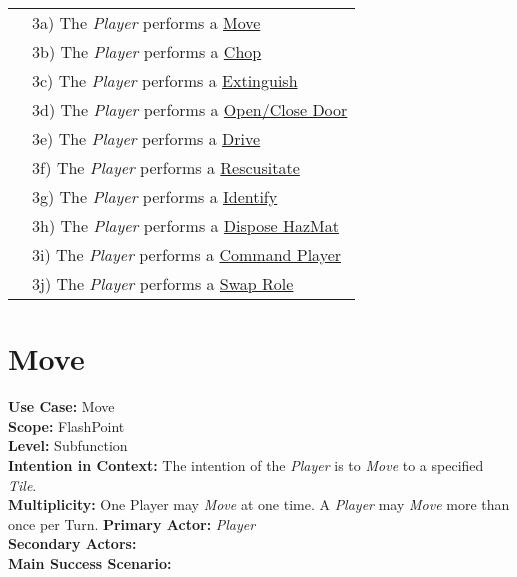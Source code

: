 \documentclass{article}
\begin{document}
	\begin{tabular}{l l}
		&3a) The \textit{Player} performs a \underline{Move}\\
		&3b) The \textit{Player} performs a \underline{Chop}\\
		&3c) The \textit{Player} performs a \underline{Extinguish}\\
		&3d) The \textit{Player} performs a \underline{Open/Close Door}\\
		&3e) The \textit{Player} performs a \underline{Drive}\\
		&3f) The \textit{Player} performs a \underline{Rescusitate}\\
		&3g) The \textit{Player} performs a \underline{Identify}\\
		&3h) The \textit{Player} performs a \underline{Dispose HazMat}\\
		&3i) The \textit{Player} performs a \underline{Command Player}\\
		&3j) The \textit{Player} performs a  \underline{Swap Role}\\
	\end{tabular}
	
	\section*{Move}
	\textbf{Use Case:} Move\\
	\textbf{Scope:} FlashPoint\\
	\textbf{Level:} Subfunction\\
	\textbf{Intention in Context: } The intention of the \textit{Player} is to \textit{Move} to a specified \textit{Tile}.\\
	\textbf{Multiplicity: } One Player may \textit{Move} at one time. A \textit{Player} may \textit{Move} more than once per Turn.
	\textbf{Primary Actor:} \textit{Player} \\
	\textbf{Secondary Actors:} \\
	\textbf{Main Success Scenario:}\\
	
\end{document}
